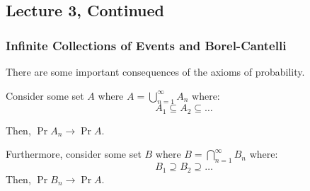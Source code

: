 \subsection{Lecture 3, Continued}

\subsubsection{Infinite Collections of Events and Borel-Cantelli}
There are some important consequences of the axioms of probability.

\begin{theorem} 
    Consider some set $A$ where $A = \bigcup_{n = 1}^{\infty} A_n$ where:
    \[ A_1 \subseteq A_2 \subseteq \dots \]

    Then, $\Pr{A_n} \rightarrow \Pr{A}$.

    Furthermore, consider some set $B$ where $B = \bigcap_{n = 1}^{\infty} B_n$ where:
    \[ B_1 \supseteq B_2 \supseteq \dots \]
    Then, $\Pr{B_n} \rightarrow \Pr{A}$.
\end{theorem}


